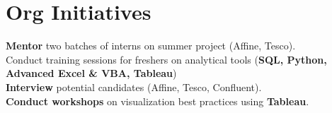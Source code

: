 \section{Org Initiatives}
  \begin{itemize}[leftmargin=0.1in, label={}]
    \normalsize{
      \item{
        \textbf{Mentor} two batches of interns on summer project (Affine, Tesco). \\
        Conduct training sessions for freshers on analytical tools (\textbf{SQL, Python, Advanced Excel \& VBA, Tableau}) \\
        \textbf{Interview} potential candidates (Affine, Tesco, Confluent). \\
        \textbf{Conduct workshops} on visualization best practices using \textbf{Tableau}. \\
      }
    }
  \end{itemize}
